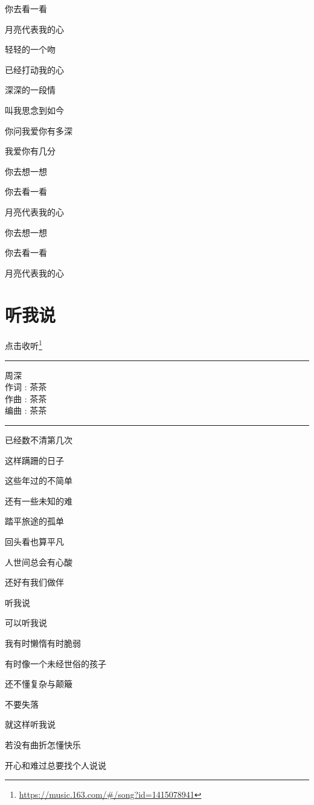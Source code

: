 \documentclass[]{ctexbook}
\renewcommand{\href}[2]{#2\footnote{\url{#1}}}
\begin{document}
你去看一看

月亮代表我的心

轻轻的一个吻

已经打动我的心

深深的一段情

叫我思念到如今

你问我爱你有多深

我爱你有几分

你去想一想

你去看一看

月亮代表我的心

你去想一想

你去看一看

月亮代表我的心

\section*{听我说}\label{listen-to-me}


\href{https://music.163.com/\#/song?id=1415078941}{点击收听}

\begin{center}\rule{0.5\linewidth}{0.5pt}\end{center}

周深\\
作词 : 茶茶\\
作曲 : 茶茶\\
编曲 : 茶茶

\begin{center}\rule{0.5\linewidth}{0.5pt}\end{center}

已经数不清第几次

这样蹒跚的日子

这些年过的不简单

还有一些未知的难

踏平旅途的孤单

回头看也算平凡

人世间总会有心酸

还好有我们做伴

听我说

可以听我说

我有时懒惰有时脆弱

有时像一个未经世俗的孩子

还不懂复杂与颠簸

不要失落

就这样听我说

若没有曲折怎懂快乐

开心和难过总要找个人说说
\end{document}
